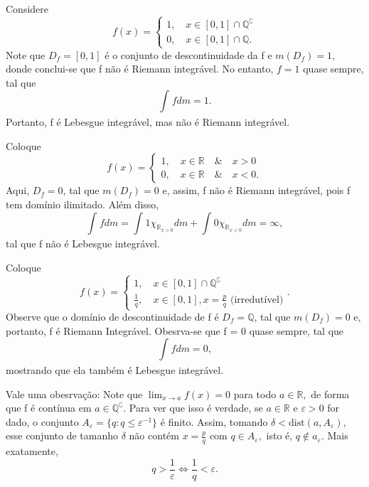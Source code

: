 \documentclass[MeasureTheory/measure_theory.tex]{subfiles}
\begin{document}
\begin{example}
	Considere
	\[
		f(x) = \left\{\begin{array}{ll}
			1,\quad x\in [0,1]\cap \mathbb{Q}^{\complement} \\
			0,\quad x\in [0,1]\cap \mathbb{Q}.
		\end{array}\right.
	\]
	Note que \(D_{f} = [0, 1]\) é o conjunto de descontinuidade da f e \(m(D_{f}) = 1,\) donde conclui-se que f não é Riemann integrável. No entanto,
	\(f=1\) quase sempre, tal que
	\[
		\int_{}f dm = 1.
	\]
	Portanto, f é Lebesgue integrável, mas não é Riemann integrável.
\end{example}
\begin{example}
	Coloque
	\[
		f(x) = \left\{\begin{array}{ll}
			1,\quad x\in \mathbb{R} \quad \&\quad x>0 \\
			0,\quad x\in \mathbb{R} \quad \&\quad  x < 0.
		\end{array}\right.
	\]
	Aqui, \(D_{f} = 0\), tal que \(m(D_{f}) = 0\) e, assim, f não é Riemann integrável, pois f tem domínio ilimitado. Além disso,
	\[
		\int_{}f dm = \int_{}1 \chi_{\mathbb{R}_{x > 0}} dm + \int_{}0\chi_{\mathbb{R}_{x < 0}} dm = \infty,
	\]
	tal que f não é Lebesgue integrável.
\end{example}
\begin{example}
	Coloque
	\[
		f(x) = \left\{\begin{array}{ll}
			1,\quad x\in [0, 1]\cap \mathbb{Q}^{\complement} \\
			\frac{1}{q},\quad x\in[0,1], x = \frac{p}{q}\text{ (irredutível)}
		\end{array}\right..
	\]
	Observe que o domínio de descontinuidade de f é \(D_f = \mathbb{Q}\), tal que \(m(D_{f}) = 0\) e, portanto, f é Riemann Integrável. Obesrva-se que f = 0 quase sempre, tal que
	\[
		\int_{}f dm = 0,
	\]
	mostrando que ela também é Lebesgue integrável.

	Vale uma obesrvação: Note que \(\lim_{x\to a}f(x) = 0\) para todo \(a\in \mathbb{R},\) de forma que f é contínua em \(a\in \mathbb{Q}^{\complement}\). Para ver que isso é verdade, se \(a\in \mathbb{R}\) e \(\varepsilon > 0\) for dado,
	o conjunto \(A_{\varepsilon } = \{q: q \leq \varepsilon^{-1}\}\) é finito. Assim, tomando \(\delta  < \mathrm{dist}(a, A_{\varepsilon }),\) esse conjunto de tamanho \(\delta \) não contém \(x = \frac{p}{q}\) com \(q\in A_{\varepsilon },\) isto é,
	\(q\not\in a_{\varepsilon }.\) Mais exatamente,
	\[
		q > \frac{1}{\varepsilon } \Longleftrightarrow \frac{1}{q} < \varepsilon .
	\]
\end{example}
\end{document}
